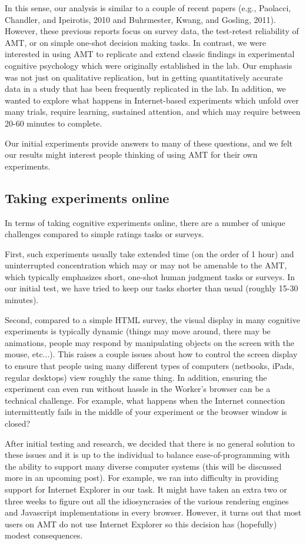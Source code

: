 \documentclass[3p,twocolumn,authoryear,10pt]{elsarticle}
\begin{document}
In this sense, our analysis is similar to a couple of recent papers (e.g., Paolacci, Chandler, and Ipeirotis, 2010 and Buhrmester, Kwang, and Gosling, 2011). However, these previous reports focus on survey data, the test-retest reliability of AMT, or on simple one-shot decision making tasks. In contrast, we were interested in using AMT to replicate and extend classic findings in experimental cognitive psychology which were originally established in the lab. Our emphasis was not just on qualitative replication, but in getting quantitatively accurate data in a study that has been frequently replicated in the lab.  In addition, we wanted to explore what happens in Internet-based experiments which unfold over many trials, require learning, sustained attention, and which may require between 20-60 minutes to complete.

Our initial experiments provide answers to many of these questions, and we felt our results might interest people thinking of using AMT for their own experiments.


\subsection{Taking experiments online}

In terms of taking cognitive experiments online, there are a number of unique challenges compared to simple ratings tasks or surveys.

First, such experiments usually take extended time (on the order of 1 hour) and uninterrupted concentration which may or may not be amenable to the AMT, which typically emphasizes short, one-shot human judgment tasks or surveys. In our initial test, we have tried to keep our tasks shorter than usual (roughly 15-30 minutes).

Second, compared to a simple HTML survey, the visual display in many cognitive experiments is typically dynamic (things may move around, there may be animations, people may respond by manipulating objects on the screen with the mouse, etc...). This raises a couple issues about how to control the screen display to ensure that people using many different types of computers (netbooks, iPads, regular desktops) view roughly the same thing. In addition, ensuring the experiment can even run without hassle in the Worker's browser can be a technical challenge. For example, what happens when the Internet connection intermittently fails in the middle of your experiment or the browser window is closed?

After initial testing and research, we decided that there is no general solution to these issues and it is up to the individual to balance ease-of-programming with the ability to support many diverse computer systems (this will be discussed more in an upcoming post). For example, we ran into difficulty in providing support for Internet Explorer in our task. It might have taken an extra two or three weeks to figure out all the idiosyncrasies of the various rendering engines and Javascript implementations in every browser. However, it turns out that most users on AMT do not use Internet Explorer so this decision has (hopefully) modest consequences.
\end{document}
